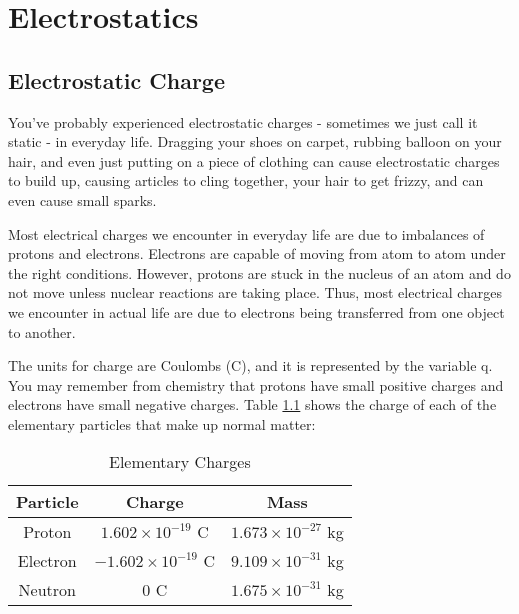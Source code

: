 \chapter{Electrostatics} \label{chap:Electrostatics}
		\section{Electrostatic Charge}  
		
		You've probably experienced electrostatic charges - sometimes we just call it static - in everyday life.  Dragging your shoes on carpet, rubbing  balloon on your hair, and even just putting on a piece of clothing can cause electrostatic charges to build up, causing articles to cling together, your hair to get frizzy, and can even cause small sparks. 
		
		Most electrical charges we encounter in everyday life are due to imbalances of protons and electrons. Electrons are capable of moving from atom to atom under the right conditions.  However, protons are stuck in the nucleus of an atom and do not move unless nuclear reactions are taking place.  Thus, most electrical charges we encounter in actual life are due to electrons being transferred from one object to another.   
		
		The units for charge are Coulombs (C), and it is represented by the variable q.  You may remember from chemistry that protons have small positive charges and electrons have small negative charges.  Table \ref{table:elementarycharges} shows the charge of each of the elementary particles that make up normal matter:
		
		 
		\begin{center}
			\begin{table}[!h]
				\centering
			\caption{Elementary Charges} \label{table:elementarycharges} 
				\begin{tabular}{|c|c|c|}
					\hline
					\textbf{Particle} & \textbf{Charge}	& \textbf{Mass} \\
					\hline
					Proton & $1.602\times 10^{-19}$ C  & $1.673\times10^{-27}$ kg\\
					\hline
					Electron & $-1.602\times 10^{-19}$ C  & $9.109 \times 10^{-31} $ kg  \\
					\hline
					Neutron & $0$ C  & $1.675 \times 10^{-31} $ kg  \\
					\hline
				\end{tabular}
				
			\end{table}
		\end{center}		
		
